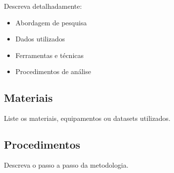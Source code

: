 
Descreva detalhadamente:
\begin{itemize}
    \item Abordagem de pesquisa
    \item Dados utilizados
    \item Ferramentas e técnicas
    \item Procedimentos de análise
\end{itemize}

\subsection{Materiais}

Liste os materiais, equipamentos ou datasets utilizados.

\subsection{Procedimentos}

Descreva o passo a passo da metodologia.
